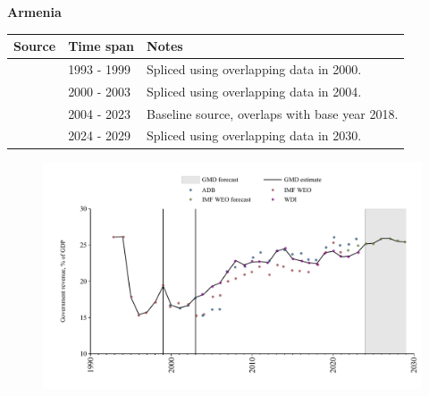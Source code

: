 \documentclass[12pt,a4paper,landscape]{article}
\begin{document}
\begin{adjustbox}{max totalsize={\paperwidth}{\paperheight},center}
\begin{minipage}[t][\textheight][t]{\textwidth}
\vspace*{0.5cm}
{}
\begin{center}
{\Large\bfseries Armenia}
\end{center}
\vspace{0.5cm}
\begin{table}[H]
\centering
\small
\begin{tabular}{|l|l|l|}
\hline
\textbf{Source} & \textbf{Time span} & \textbf{Notes} \\
\hline
\rowcolor{white}\cite{IMF_WEO}& 1993 - 1999 &Spliced using overlapping data in 2000.\\
\rowcolor{lightgray}\cite{ADB}& 2000 - 2003 &Spliced using overlapping data in 2004.\\
\rowcolor{white}\cite{WDI}& 2004 - 2023 &Baseline source, overlaps with base year 2018.\\
\rowcolor{lightgray}\cite{IMF_WEO_forecast}& 2024 - 2029 &Spliced using overlapping data in 2030.\\
\hline
\end{tabular}
\end{table}
\begin{figure}[H]
\centering
\includegraphics[width=\textwidth,height=0.6\textheight,keepaspectratio]{graphs/ARM_govrev_GDP.pdf}
\end{figure}
\end{minipage}
\end{adjustbox}
\end{document}
